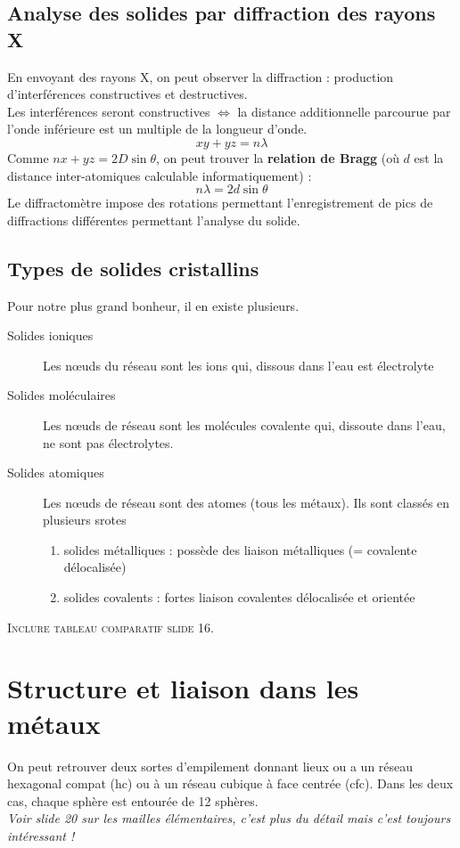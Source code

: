 \documentclass	[11pt, a4paper, openany]{book}
\begin{document}
	\subsection*{Analyse des solides par diffraction des rayons X}
	En envoyant des rayons X, on peut observer la diffraction : production d'interférences constructives et destructives.\\
	Les interférences seront constructives $\Leftrightarrow$ la distance additionnelle parcourue par l'onde inférieure est un multiple de la longueur d'onde.
	$$xy + yz = n\lambda$$
	Comme $nx + yz = 2D\sin \theta$, on peut trouver la \textbf{relation de Bragg} (où $d$ est la distance inter-atomiques calculable informatiquement) :
	$$n\lambda = 2d\sin \theta$$
	Le diffractomètre impose des rotations permettant l'enregistrement de pics de diffractions différentes permettant l'analyse du solide.
	
	\subsection*{Types de solides cristallins}
	Pour notre plus grand bonheur, il en existe plusieurs.
	\begin{description}
		\item[Solides ioniques] Les nœuds du réseau sont les ions qui, dissous dans l'eau est électrolyte 
		\item[Solides moléculaires] Les nœuds de réseau sont les molécules covalente qui, dissoute dans l'eau, ne sont pas électrolytes.
		\item[Solides atomiques] Les nœuds de réseau sont des atomes (tous les métaux). Ils sont classés en plusieurs srotes
		\begin{enumerate}
			\item solides métalliques : possède des liaison métalliques (= covalente délocalisée)
			\item solides covalents : fortes liaison covalentes délocalisée et orientée
		\end{enumerate}
	\end{description}
	\textsc{Inclure tableau comparatif slide 16.}
	
	
	\section{Structure et liaison dans les métaux}
	On peut retrouver deux sortes d'empilement donnant lieux ou a un réseau hexagonal compat (hc) ou à un réseau cubique à face centrée (cfc). Dans les deux cas, chaque sphère est entourée de 12 sphères.\\
	\textit{Voir slide 20 sur les mailles élémentaires, c'est plus du détail mais c'est toujours intéressant !}
	
\end{document}
